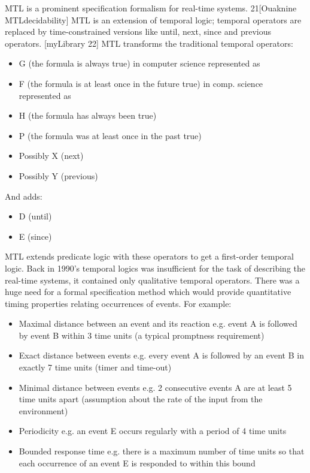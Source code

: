 MTL is a prominent specification formalism for real-time systems. 21[Ouaknine MTLdecidability] MTL is an extension of temporal logic; temporal operators are replaced by time-constrained versions like until, next, since and previous operators. [myLibrary 22] MTL transforms the traditional temporal operators:

\begin{itemize}
	\item G (the formula is always true) in computer science represented as
	\item F (the formula is at least once in the future true) in comp. science represented as
	\item H (the formula has always been true)
	\item P (the formula was at least once in the past true)
	\item Possibly X (next)
	\item Possibly Y (previous)
\end{itemize}

And adds:

\begin{itemize}
	\item D (until)
	\item E (since)
\end{itemize}

MTL extends predicate logic with these operators to get a first-order temporal logic. Back in 1990’s temporal logics was insufficient for the task of describing the real-time systems, it contained only qualitative temporal operators. There was a huge need for a formal specification method which would provide quantitative timing properties relating occurrences of events. For example:

\begin{itemize}
	\item Maximal distance between an event and its reaction e.g. event A is followed by event B within 3 time units (a typical promptness requirement)
	\item Exact distance between events e.g. every event A is followed by an event B in exactly 7 time units (timer and time-out)
	\item Minimal distance between events e.g. 2 consecutive events A are at least 5 time units apart (assumption about the rate of the input from the environment)
	\item Periodicity e.g. an event E occurs regularly with a period of 4 time units
	\item Bounded response time e.g. there is a maximum number of time units so that each occurrence of an event E is responded to within this bound
\end{itemize}

